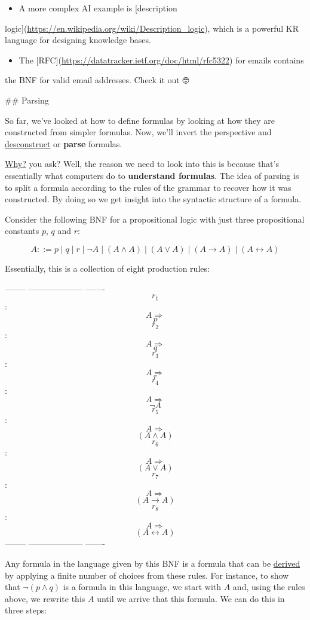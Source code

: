 \documentclass[11pt]{article}
\begin{document}
\begin{itemize}
\item A more complex AI example is [description
\end{itemize}
logic](\url{https://en.wikipedia.org/wiki/Description\_logic}), which is a powerful KR
language for designing knowledge bases.

\begin{itemize}
\item The [RFC](\url{https://datatracker.ietf.org/doc/html/rfc5322}) for emails contains
\end{itemize}
the BNF for valid email addresses. Check it out 🤓

\#\# Parsing

So far, we've looked at how to define formulas by looking at how they are
constructed from simpler formulas. Now, we'll invert the perspective and
\uline{desconstruct} or \textbf{\textbf{parse}} formulas.

\uline{Why?} you ask? Well, the reason we need to look into this is because that's
essentially what computers do to \textbf{\textbf{understand formulas}}. The idea of parsing is
to split a formula according to the rules of the grammar to recover how it was
constructed. By doing so we get insight into the syntactic structure of a formula. 

Consider the following BNF for a propositional logic with just three propositional 
constants \(p\), \(q\) and \(r\):

$$A::= p\mid q\mid r\mid\neg A\mid (A\land A)\mid (A\lor A)\mid (A\rightarrow A)\mid (A\leftrightarrow A)$$

Essentially, this is a collection of eight production rules:

--------  --------------------  -------
$$r_1$$:  $$A\Longrightarrow$$  $$p$$  
$$r_2$$:  $$A\Longrightarrow$$  $$q$$   
$$r_3$$:  $$A\Longrightarrow$$  $$r$$   
$$r_4$$:  $$A\Longrightarrow$$  $$\neg A$$  
$$r_5$$:  $$A\Longrightarrow$$  $$(A\land A)$$    
$$r_6$$:  $$A\Longrightarrow$$  $$(A\lor A)$$  
$$r_7$$:  $$A\Longrightarrow$$  $$(A\rightarrow A)$$  
$$r_8$$:  $$A\Longrightarrow$$  $$(A\leftrightarrow A)$$  
--------  --------------------  -------


Any formula in the language given by this BNF is a formula that can be \uline{derived} by applying a finite number of choices from these rules.
For instance, to show that \(\neg(p\land q)\) is a formula in this language, we start with \(A\) and, using the rules above, we rewrite this \(A\) until we arrive that this formula. We can do this in three steps:
\end{document}
